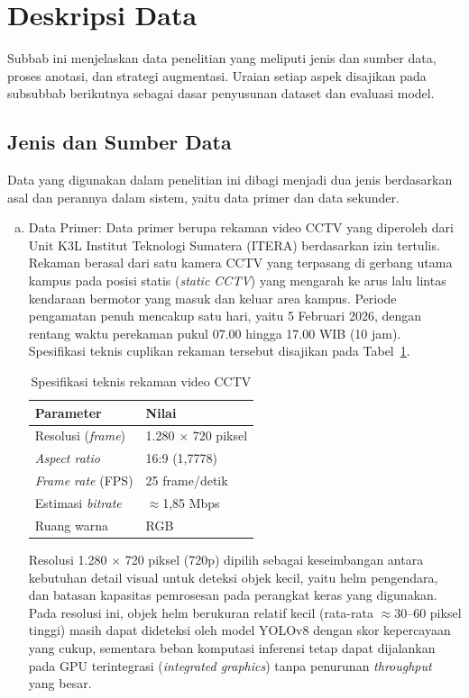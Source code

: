 \section{Deskripsi Data}
Subbab ini menjelaskan data penelitian yang meliputi jenis dan sumber data, proses anotasi, dan strategi augmentasi. Uraian setiap aspek disajikan pada subsubbab berikutnya sebagai dasar penyusunan dataset dan evaluasi model.
\subsection{Jenis dan Sumber Data}
Data yang digunakan dalam penelitian ini dibagi menjadi dua jenis berdasarkan asal dan perannya dalam sistem, yaitu data primer dan data sekunder.

\begin{enumerate}[a.]
  \item Data Primer:
  Data primer berupa rekaman video CCTV yang diperoleh dari Unit K3L Institut Teknologi Sumatera (ITERA) berdasarkan izin tertulis. Rekaman berasal dari satu kamera CCTV yang terpasang di gerbang utama kampus pada posisi statis (\textit{static CCTV}) yang mengarah ke arus lalu lintas kendaraan bermotor yang masuk dan keluar area kampus. Periode pengamatan penuh mencakup satu hari, yaitu 5 Februari 2026, dengan rentang waktu perekaman pukul 07.00 hingga 17.00 WIB (10 jam). Spesifikasi teknis cuplikan rekaman tersebut disajikan pada Tabel~\ref{tab:metadata-video}.
 
  \begin{table}[htpb]
    \centering
    \caption{Spesifikasi teknis rekaman video CCTV}
    \label{tab:metadata-video}
    \begin{tabular}{p{} p{}}
      \toprule
      \textbf{Parameter} & \textbf{Nilai} \\
      \midrule
      Resolusi (\textit{frame}) & 1.280 $\times$ 720 piksel\\
      \textit{Aspect ratio} & 16:9 (1,7778) \\
      \textit{Frame rate} (FPS) & 25 frame/detik \\
      Estimasi \textit{bitrate} & $\approx$1,85 Mbps \\
      Ruang warna & RGB \\
      \bottomrule
    \end{tabular}
  \end{table}
 
  
 
  Resolusi 1.280 $\times$ 720 piksel (720p) dipilih sebagai keseimbangan antara kebutuhan detail visual untuk deteksi objek kecil, yaitu helm pengendara, dan batasan kapasitas pemrosesan pada perangkat keras yang digunakan. Pada resolusi ini, objek helm berukuran relatif kecil (rata-rata $\approx$30--60 piksel tinggi) masih dapat dideteksi oleh model YOLOv8 dengan skor kepercayaan yang cukup, sementara beban komputasi inferensi tetap dapat dijalankan pada GPU terintegrasi (\textit{integrated graphics}) tanpa penurunan \textit{throughput} yang besar.



\end{enumerate}
